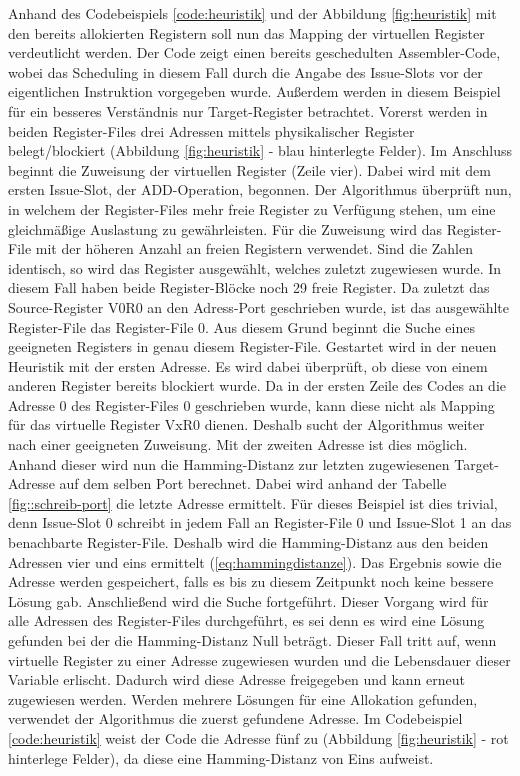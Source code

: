 Anhand des Codebeispiels \ref{code:heuristik} und der Abbildung \ref{fig:heuristik} mit den bereits allokierten Registern soll nun das Mapping der virtuellen Register verdeutlicht werden.
Der Code zeigt einen bereits geschedulten Assembler-Code, wobei das Scheduling in diesem Fall durch die Angabe des Issue-Slots vor der eigentlichen Instruktion vorgegeben wurde. Außerdem werden in diesem Beispiel für ein besseres Verständnis nur Target-Register betrachtet.
Vorerst werden in beiden Register-Files drei Adressen mittels physikalischer Register belegt/blockiert (Abbildung \ref{fig:heuristik} - blau hinterlegte Felder). Im Anschluss beginnt die Zuweisung der virtuellen Register (Zeile vier).
Dabei wird mit dem ersten Issue-Slot, der ADD-Operation, begonnen. Der Algorithmus überprüft nun, in welchem der Register-Files mehr freie Register zu Verfügung stehen, um eine gleichmäßige Auslastung zu gewährleisten. Für die Zuweisung wird das Register-File mit der höheren Anzahl an freien Registern verwendet. Sind die Zahlen identisch, so wird das Register ausgewählt, welches zuletzt zugewiesen wurde. In diesem Fall haben beide Register-Blöcke noch 29 freie Register. Da zuletzt das Source-Register V0R0 an den Adress-Port geschrieben wurde, ist das ausgewählte Register-File das Register-File 0.
Aus diesem Grund beginnt die Suche eines geeigneten Registers in genau diesem Register-File. Gestartet wird in der neuen Heuristik mit der ersten Adresse. Es wird dabei überprüft, ob diese von einem anderen Register bereits blockiert wurde. Da in der ersten Zeile des Codes an die Adresse 0 des Register-Files 0 geschrieben wurde, kann diese nicht als Mapping für das virtuelle Register VxR0 dienen. Deshalb sucht der Algorithmus weiter nach einer geeigneten Zuweisung. Mit der zweiten Adresse ist dies möglich. Anhand dieser wird nun die Hamming-Distanz zur letzten zugewiesenen Target-Adresse auf dem selben Port berechnet. Dabei wird anhand der Tabelle \ref{fig::schreib-port} die letzte Adresse ermittelt. Für dieses Beispiel ist dies trivial, denn Issue-Slot 0 schreibt in jedem Fall an Register-File 0 und Issue-Slot 1 an das benachbarte Register-File. Deshalb wird die Hamming-Distanz aus den beiden Adressen vier und eins ermittelt (\ref{eq:hammingdistanze}). Das Ergebnis sowie die Adresse werden gespeichert, falls es bis zu diesem Zeitpunkt noch keine bessere Lösung gab. Anschließend wird die Suche fortgeführt. Dieser Vorgang wird für alle Adressen des Register-Files durchgeführt, es sei denn es wird eine Lösung gefunden bei der die Hamming-Distanz Null beträgt. Dieser Fall tritt auf, wenn virtuelle Register zu einer Adresse zugewiesen wurden und die Lebensdauer dieser Variable erlischt. Dadurch wird diese Adresse freigegeben und kann erneut zugewiesen werden.  Werden mehrere Lösungen für eine Allokation gefunden, verwendet der Algorithmus die zuerst gefundene Adresse. Im Codebeispiel \ref{code:heuristik} weist der Code die Adresse fünf zu (Abbildung \ref{fig:heuristik} - rot hinterlege Felder), da diese eine Hamming-Distanz von Eins aufweist.
